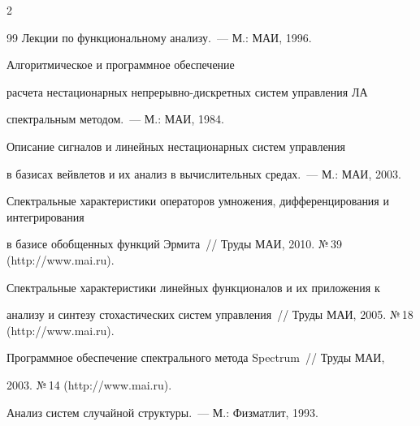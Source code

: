 \begin{multicols}{2}
{{\begin{thebibliography}{99}
 Лекции по функциональному анализу.~--- М.: МАИ, 1996.







 Алгоритмическое и программное обеспечение 


расчета нестационарных не\-пре\-рыв\-но-дис\-крет\-ных сис\-тем управ\-ле\-ния ЛА


спект\-раль\-ным методом.~--- М.: МАИ, 1984.









Описание сигналов и линейных нестационарных сис\-тем управления 


в базисах вейвлетов и их анализ в вычислительных средах.~--- М.: МАИ, 2003.









Спектральные характеристики операторов умножения, дифференцирования и интегрирования 


в базисе обобщенных функций Эрмита~// Труды МАИ, 2010. №\,39 ({\sf http://www.mai.ru}).







 Спектральные характеристики линейных функционалов и их приложения к 


анализу и синтезу стохастических сис\-тем управления~// Труды МАИ, 2005. №\,18 ({\sf http://www.mai.ru}).







 Программное обеспечение спектрального метода Spectrum~// Труды МАИ, 


2003. №\,14 ({\sf http://www.mai.ru}).





 \label{end\stat}









Анализ сис\-тем случайной структуры.~--- М.: Физматлит, 1993.


 \end{thebibliography}


}


}








\end{multicols}       


